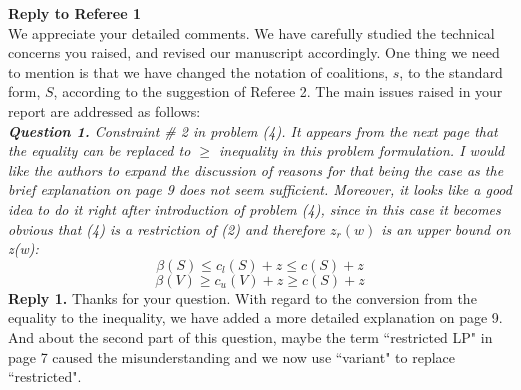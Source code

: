 \documentclass[11pt]{article}
\begin{document}
\noindent \textbf{\large Reply to Referee 1}
\\[3mm]
We appreciate your detailed comments.
We have carefully studied the technical concerns you raised, and revised our manuscript accordingly.
One thing we need to mention is that we have changed the notation of coalitions, $s$, to the standard form, $S$, according to the suggestion of  Referee 2.
The main issues raised in your report are addressed as follows:
\\[4mm]
%
%
\noindent \textit{\textbf{Question 1.}
Constraint \# 2 in problem (4). It appears from the next page that the equality can be replaced to $\geq$ inequality in this problem formulation. I would like the authors to expand the discussion of reasons for that being the case as the brief explanation on page 9 does not seem sufficient. Moreover, it looks like a good idea to do it right after introduction of problem (4), since in this case it becomes obvious that (4) is a restriction of (2) and therefore $z_r(w)$ is an upper bound on z(w):}
$$\beta(S) \leq c_l(S) + z \leq c(S) + z$$
$$\beta(V) \geq c_u(V) + z \geq c(S) + z$$
\noindent \textbf{Reply 1.}
Thanks for your question. With regard to the conversion from the equality to the inequality, we have added a more detailed explanation on page 9. And about the second part of this question, maybe the term ``restricted LP" in page 7 caused the misunderstanding and we now use ``variant" to replace ``restricted".
\end{document}
